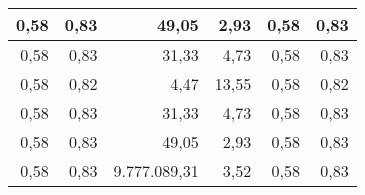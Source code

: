 \begin{table}[H]
{\begin{tabular}{|r|r|r|r|r|r|}
0,58                                                               & 0,83                                                              & 49,05                                                         & 2,93                                                          & 0,58                                                               & 0,83                                                               \\ \hline
0,58                                                               & 0,83                                                              & 31,33                                                         & 4,73                                                          & 0,58                                                               & 0,83                                                               \\ \hline
0,58                                                               & 0,82                                                              & 4,47                                                          & 13,55                                                         & 0,58                                                               & 0,82                                                               \\ \hline
0,58                                                               & 0,83                                                              & 31,33                                                         & 4,73                                                          & 0,58                                                               & 0,83                                                               \\ \hline
0,58                                                               & 0,83                                                              & 49,05                                                         & 2,93                                                          & 0,58                                                               & 0,83                                                               \\ \hline
0,58                                                               & 0,83                                                              & 9.777.089,31                                                  & 3,52                                                          & 0,58                                                               & 0,83                                                               \\ \hline

\end{tabular}}
\end{table}
